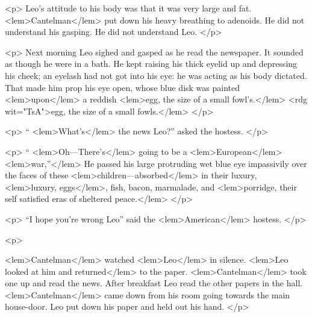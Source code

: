 				<p>
					Leo's attitude to his body was that it was very large and fat. 
<lem>Cantelman</lem>{} put down his 
					heavy breathing to adenoids. He did not understand his gasping. He did not understand 
					Leo. 
				</p>

				<p>
					Next morning Leo sighed and gasped as he read the newspaper. It sounded as though 
					he were in a bath. He kept raising his thick eyelid up and depressing his cheek; 
					an eyelash had not got into his eye: he was acting as his body dictated. That made 
					him prop his eye open, whose blue disk was painted 
<lem>upon</lem>{} a reddish 
<lem>egg, the size of a small fowl's.</lem>
<rdg wit="TsA">egg, the size of a small fowls.</lem>
						{}  
 				</p>

				<p>
					“
<lem>What's</lem> 
						{}
					the news Leo?” asked the hostess. 
 				</p>

				<p>
				“
<lem>Oh---There's</lem>{} going to be a 
<lem>European</lem>{} 
<lem>war,”</lem>{} 
						{} 
					He passed his large protruding wet blue eye impassivily over the 
					faces of these 
<lem>children---absorbed</lem>
						{} 
					in their luxury, 
<lem>luxury, eggs</lem>{}, fish, bacon, marmalade, 
					and 
<lem>porridge, their self satisfied eras of sheltered peace.</lem>{} 
 				</p>

				<p>
					“I hope you're wrong Leo” said the 
<lem>American</lem>{} hostess. 
 				</p>

				<p>
					
<lem>Cantelman</lem>{} watched 
<lem>Leo</lem>
						{} 
					in silence. 
<lem>Leo looked at him and returned</lem> 
						{} 
					to the paper. 
<lem>Cantelman</lem>{} took one up and 
					read the news. After breakfast Leo read the other papers in the hall. 
<lem>Cantelman</lem>
						{} 
					came 
					down from his room going towards the main house-door. Leo put down his paper and held 
					out his hand. 
 				</p>

